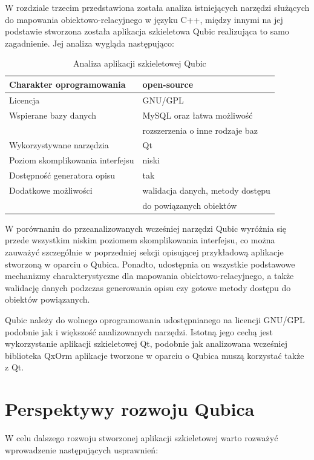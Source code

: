 \documentclass[12pt]{report}
\begin{document}
W rozdziale trzecim przedstawiona została analiza istniejących narzędzi służących do mapowania obiektowo-relacyjnego w języku C++, między innymi na jej podstawie
stworzona została aplikacja szkieletowa Qubic realizująca to samo zagadnienie. Jej analiza wygląda następująco:

\begin{table}[h]
\centering
\begin{tabular}{| l | l |} 
\hline 
Charakter oprogramowania & open-source \\ \hline
Licencja & GNU/GPL  \\ \hline
Wspierane bazy danych & MySQL oraz łatwa możliwość \\ \hline
&  rozszerzenia o inne rodzaje baz \\ \hline
Wykorzystywane narzędzia & Qt  \\ \hline
Poziom skomplikowania interfejsu & niski  \\ \hline
Dostępność generatora opisu & tak  \\ \hline
Dodatkowe możliwości &  walidacja danych, metody dostępu  \\ \hline
& do powiązanych obiektów \\ \hline
\end{tabular} 
\caption{Analiza aplikacji szkieletowej Qubic}
\end{table}

W porównaniu do przeanalizowanych wcześniej narzędzi Qubic wyróżnia się przede wszystkim niskim poziomem skomplikowania interfejsu, co można zauważyć szczególnie w
poprzedniej sekcji opisującej przykładową aplikacje stworzoną w oparciu o Qubica. Ponadto, udostępnia on wszystkie podstawowe mechanizmy charakterystyczne dla mapowania
obiektowo-relacyjnego, a także walidację danych podzczas generowania opisu czy gotowe metody dostępu do obiektów powiązanych. 

Qubic należy do wolnego oprogramowania udostępnianego na licencji GNU/GPL podobnie jak i większość analizowanych narzędzi. Istotną jego cechą jest wykorzystanie aplikacji
szkieletowej Qt, podobnie jak analizowana wcześniej biblioteka QxOrm aplikacje tworzone w oparciu o Qubica muszą korzystać także z Qt. 

\section{Perspektywy rozwoju Qubica} \label{perspektywyqubic}

W celu dalszego rozwoju stworzonej aplikacji szkieletowej warto rozważyć wprowadzenie następujących usprawnień:
\end{document}
